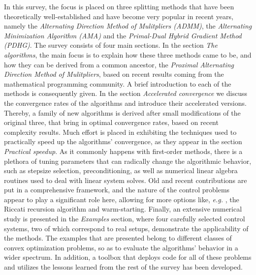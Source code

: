 \documentclass[paper=a4, fontsize=11pt]{scrartcl}
\newcommand{\eg}{{\it e.g. }}
\begin{document}
In this survey, the focus is placed on three splitting methods that have been theoretically well-established and have become very popular in recent years, namely the \emph{Alternating Direction Method of Mulitpliers (ADMM)}, the \emph{Alternating Minimization Algorithm (AMA)} and the \emph{Primal-Dual Hybrid Gradient Method (PDHG)}. The survey consists of four main sections. In the section \emph{The algorithms}, the main focus is to explain how these three methods came to be, and how they can be derived from a common ancestor, the \emph{Proximal Alternating Direction Method of Mulitpliers}, based on recent results coming from the mathematical programming community. A brief introduction to each of the methods is consequently given. In the section \emph{Accelerated convergence} we discuss the convergence rates of the algorithms and introduce their accelerated versions. Thereby, a family of new algorithms is derived after small modifications of the original three, that bring in optimal convergence rates, based on recent complexity results. Much effort is placed in exhibiting the techniques used to practically speed up the algorithms' convergence, as they appear in the section \emph{Practical speedup}. As it commonly happens with first-order methods, there is a plethora of tuning parameters that can radically change the algorithmic behavior, such as stepsize selection, preconditioning, as well as numerical linear algebra routines used to deal with linear system solves. Old and recent contributions are put in a comprehensive framework, and the nature of the control problems appear to play a significant role here, allowing for more options like, \eg, the Riccati recursion algorithm and warm-starting. Finally, an extensive numerical study is presented in the \emph{Examples} section, where four carefully selected control systems, two of which correspond to real setups, demonstrate the applicability of the methods. The examples that are presented belong to different classes of convex optimization problems, so as to evaluate the algorithms' behavior in a wider spectrum.
In addition, a toolbox that deploys code for all of these problems and utilizes the lessons learned from the rest of the survey has been developed.
\end{document}
